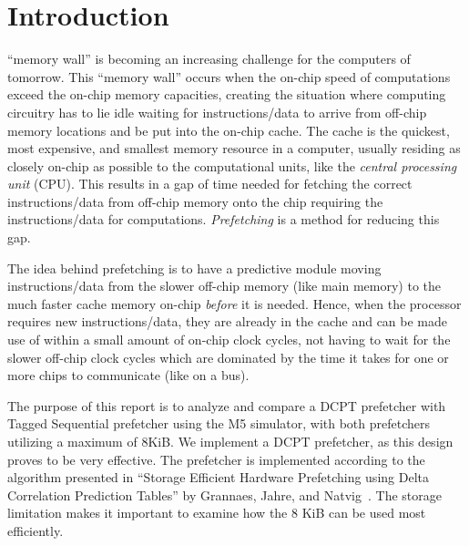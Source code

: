 \section{Introduction}

 ``memory wall'' is becoming an increasing challenge for the
computers of tomorrow. This ``memory wall'' occurs when the on-chip speed of
computations exceed the on-chip memory capacities, creating the situation where
computing circuitry has to lie idle waiting for instructions/data to arrive from
off-chip memory locations and be put into the on-chip cache. The cache is the
quickest, most expensive, and smallest memory resource in a computer, usually
residing as closely on-chip as possible to the computational units, like the
\emph{central processing unit} (CPU). This results in a gap of time needed for
fetching the correct instructions/data from off-chip memory onto the chip
requiring the instructions/data for computations. \emph{Prefetching} is a method
for reducing this gap.

The idea behind prefetching is to have a predictive module moving
instructions/data from the slower off-chip memory (like main memory) to the much
faster cache memory on-chip \emph{before} it is needed. Hence, when the
processor requires new instructions/data, they are already in the cache and can
be made use of within a small amount of on-chip clock cycles, not having to wait
for the slower off-chip clock cycles which are dominated by the time it takes
for one or more chips to communicate (like on a bus).

The purpose of this report is to analyze and compare a DCPT prefetcher with
Tagged Sequential prefetcher using the M5 simulator, with both prefetchers
utilizing a maximum of 8KiB. We implement a DCPT prefetcher, as this design
proves to be very effective.
The prefetcher is implemented according to the
algorithm presented in ``Storage Efficient Hardware Prefetching using Delta
Correlation Prediction Tables'' by Grannaes, Jahre, and Natvig~\cite{dcpt}. The
storage limitation makes it important to examine how the 8 KiB can be used most
efficiently.


